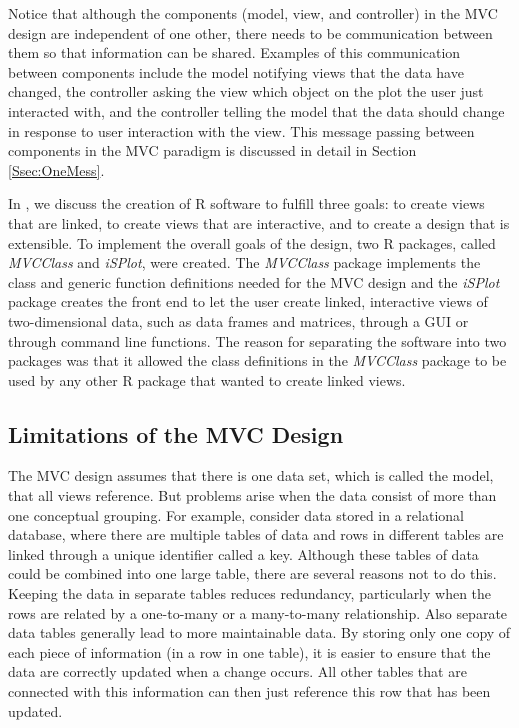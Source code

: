\documentclass{article}[11pt]
\newcommand{\Rpackage}[1]{{\textit{#1}}}
\begin{document}
Notice that although the components (model, view, and controller) in the MVC
design are independent of one other, there needs to be communication
between them so that information can be shared.  Examples of this
communication between components include the model notifying views that the
data have changed, the controller asking the view which object on the plot the
user just interacted with, and the controller telling the model that the data
should change in response to user interaction with the view.  This message
passing between components in the MVC paradigm is discussed in detail in
Section \ref{Ssec:OneMess}.   

In \cite{EW05}, we discuss the creation of \textsf{R} software to fulfill
three goals: to create views that are linked, to create views that are
interactive, and to create a design that is extensible.  To implement the
overall goals of the design, two \textsf{R} packages, called
\Rpackage{MVCClass} and \Rpackage{iSPlot}, were created.  The
\Rpackage{MVCClass} package implements the class and generic function
definitions needed for the MVC design and the \Rpackage{iSPlot} package
creates the front end to let the user create linked, interactive views of
two-dimensional data, such as data frames and matrices, through a GUI or
through command line functions.  The reason for separating the software into
two packages was that it allowed the class definitions in the
\Rpackage{MVCClass} package to be used by any other \textsf{R} package that
wanted to create linked views.  

\subsection{Limitations of the MVC Design}
\label{Ssec:Limit}

The MVC design assumes that there is one data set, which is called the model,
that all views reference.  But problems arise when the data consist of more
than one conceptual grouping.  For example, consider data stored in a
relational database, where there are multiple tables of data and rows in
different tables are linked through a unique identifier called a key.
Although these tables of data could be combined into one large table, there
are several reasons not to do this.  Keeping the data in separate tables
reduces redundancy, particularly when the rows are related by a one-to-many or
a many-to-many relationship.  Also separate data tables generally lead to more
maintainable data.  By storing only one copy of each piece of information (in
a row in one table), it is easier to ensure that the data are correctly
updated when a change occurs.  All other tables that are connected with this
information can then just reference this row that has been updated. 
\end{document}
